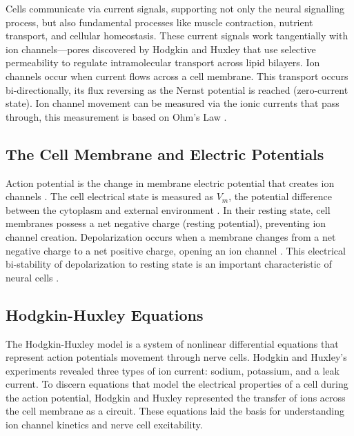 \documentclass{article} %
\begin{document}
\begin{multicols}{2}
Cells communicate via current signals, supporting not only the neural signalling process, but also fundamental processes like muscle contraction, nutrient transport, and cellular homeostasis. 
These current signals work tangentially with ion channels—pores discovered by Hodgkin and Huxley that use selective permeability to regulate intramolecular transport across lipid bilayers. 
Ion channels occur when current flows across a cell membrane. This transport occurs bi-directionally, its flux reversing as the Nernst potential is reached (zero-current state). 
Ion channel movement can be measured via the ionic currents that pass through, this measurement is based on Ohm's Law \citep{rubaiy2017electrophysiology}.

\subsection{The Cell Membrane and Electric Potentials}
\label{subsubsec:resting_potential}

Action potential is the change in membrane electric potential that creates ion channels \cite{rubaiy2017electrophysiology}. 
The cell electrical state is measured as $V_{m}$, the potential difference between the cytoplasm and external environment \cite{cervera2016bioelectrical}. 
In their resting state, cell membranes possess a net negative charge (resting potential), preventing ion channel creation. 
Depolarization occurs when a membrane changes from a net negative charge to a net positive charge, opening an ion channel \cite{rubaiy2017electrophysiology}. 
This electrical bi-stability of depolarization to resting state is an important characteristic of neural cells \cite{cervera2016bioelectrical}.

\subsection{Hodgkin-Huxley Equations}
\label{subsec:hodgekin_huxley}

The Hodgkin-Huxley model is a system of nonlinear differential equations that represent action potentials movement through nerve cells. 
Hodgkin and Huxley’s experiments revealed three types of ion current: sodium, potassium, and a leak current. 
To discern equations that model the electrical properties of a cell during the action potential, Hodgkin and Huxley represented the transfer of ions across the cell membrane as a circuit. 
These equations laid the basis for understanding ion channel kinetics and nerve cell excitability.


\end{multicols}
\end{document}
